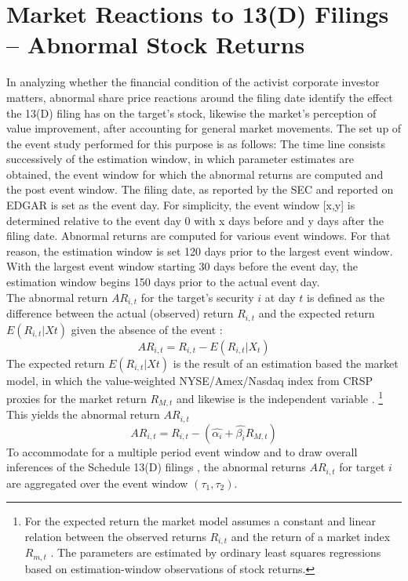 \documentclass[12pt]{article}
\begin{document}
\section{Market Reactions to 13(D) Filings -- Abnormal Stock Returns}
In analyzing whether the financial condition of the activist corporate investor matters, abnormal share price reactions around the filing date identify the effect the 13(D) filing has on the target's stock, likewise the market's perception of value improvement, after accounting for general market movements.
The set up of the event study performed for this purpose is as follows: The time line consists successively of the estimation window, in which parameter estimates are obtained, the event window for which the abnormal returns are computed and the post event window. 
The filing date, as reported by the SEC and reported on EDGAR is set as the event day. For simplicity, the event window [x,y] is determined relative to the event day 0 with x days before and y days after the filing date. Abnormal returns are computed for various event windows. For that reason, the estimation window is set 120 days prior to the largest event window. With the largest event window starting 30 days before the event day, the estimation window begins 150 days prior to the actual event day.\\
The abnormal return $AR_{i,t}$ for the target's security $i$ at day $t$ is defined as the difference between the actual (observed) return $R_{i,t}$ and the expected return $E(R_{i,t}|X{t})$ given the absence of the event \citep[p.15]{MacKinlay1997}:
	\begin{equation}\label{eq:1}
		AR_{i,t}=R_{i,t}-E(R_{i,t}|X_{t})
	\end{equation}
The expected return $E(R_{i,t}|X{t})$ is the result of an estimation based the market model, in which the value-weighted NYSE/Amex/Nasdaq index from CRSP proxies for the market return $R_{M,t}$ and likewise is the independent variable \citep[p.18]{MacKinlay1997}.
	\footnote{For the expected return the market model assumes a constant and linear relation between the observed returns $R_{i,t}$ and the return of a market index $R_{m,t}$ \citep[p.18]{MacKinlay1997}. The parameters are estimated by ordinary least squares regressions based on estimation-window observations of stock returns.}
This yields the abnormal return $AR_{i,t}$
	\begin{equation}\label{eq:2}
		AR_{i,t}=R_{i,t}-(\hat{\alpha_{i}}+\hat{\beta_{i}}R_{M,t})
	\end{equation}
To accommodate for a multiple period event window and to draw overall inferences of the Schedule 13(D) filings \citep[p.21]{MacKinlay1997}, the abnormal returns $AR_{i,t}$ for target $i$ are aggregated over the event window $(\tau_1,\tau_2)$. 
\end{document}
